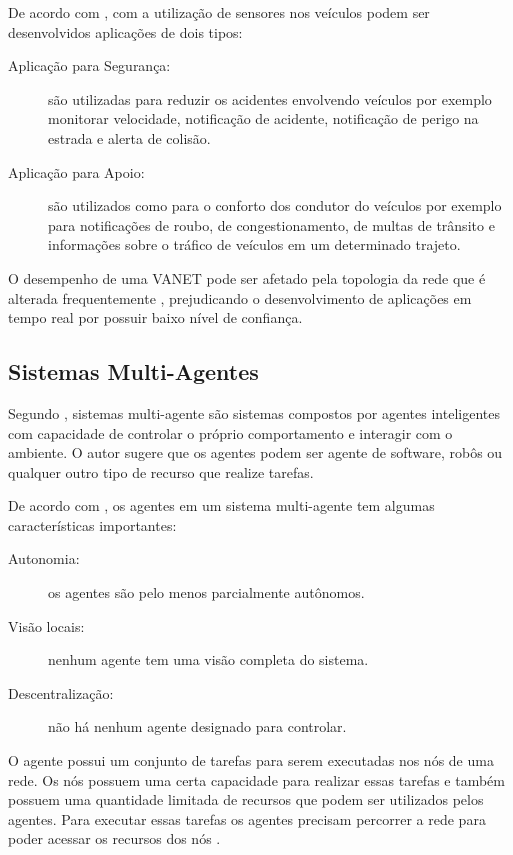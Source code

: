 De acordo com \cite{Piran:2011}, com a utilização de sensores nos veículos podem ser desenvolvidos aplicações de dois tipos:

\begin{description}
\item[Aplicação para Segurança:] são utilizadas para reduzir os acidentes envolvendo veículos por exemplo monitorar velocidade, notificação de acidente, notificação de perigo na estrada e alerta de colisão.

\item[Aplicação para Apoio:] são utilizados como para o conforto dos condutor do veículos  por exemplo para notificações de roubo, de congestionamento, de multas de trânsito e informações sobre o tráfico de veículos em um determinado trajeto.
\end{description}

O desempenho de uma VANET pode ser afetado pela topologia da rede que é alterada frequentemente \cite{Lidstrom:2010}, prejudicando o desenvolvimento de aplicações em tempo real por possuir baixo nível de confiança.

\subsection{Sistemas Multi-Agentes}

Segundo \cite{Woolridge:2001}, sistemas multi-agente são sistemas compostos por agentes inteligentes com capacidade de controlar o próprio comportamento e interagir com o ambiente. O autor \cite{Woolridge:2001} sugere que os agentes podem ser agente de software, robôs ou qualquer outro tipo de recurso que realize tarefas.

De acordo com \cite{Woolridge:2001}, os agentes em um sistema multi-agente tem algumas características importantes: 

\begin{description}
\item[Autonomia:] os agentes são pelo menos parcialmente autônomos.

\item[Visão locais:] nenhum agente tem uma visão completa do sistema.

\item[Descentralização:] não há nenhum agente designado para controlar.

\end{description}

O agente possui um conjunto de tarefas para serem executadas nos nós de uma rede. Os nós possuem uma certa capacidade para realizar essas tarefas e também possuem uma quantidade limitada de recursos que podem ser utilizados pelos agentes. Para executar essas tarefas os agentes precisam percorrer a rede para poder acessar os recursos dos nós \cite{Shehory:1998}.

